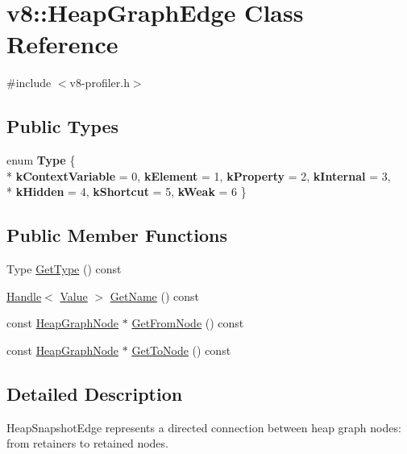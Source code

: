 \hypertarget{classv8_1_1HeapGraphEdge}{}\section{v8\+:\+:Heap\+Graph\+Edge Class Reference}
\label{classv8_1_1HeapGraphEdge}


{\ttfamily \#include $<$v8-\/profiler.\+h$>$}

\subsection*{Public Types}
\begin{DoxyCompactItemize}
\item 
\hypertarget{classv8_1_1HeapGraphEdge_a252500cf4307fe9e4fcb0335a907259b}{}enum {\bfseries Type} \{ \\*
{\bfseries k\+Context\+Variable} = 0, 
{\bfseries k\+Element} = 1, 
{\bfseries k\+Property} = 2, 
{\bfseries k\+Internal} = 3, 
\\*
{\bfseries k\+Hidden} = 4, 
{\bfseries k\+Shortcut} = 5, 
{\bfseries k\+Weak} = 6
 \}\label{classv8_1_1HeapGraphEdge_a252500cf4307fe9e4fcb0335a907259b}

\end{DoxyCompactItemize}
\subsection*{Public Member Functions}
\begin{DoxyCompactItemize}
\item 
Type \hyperlink{classv8_1_1HeapGraphEdge_a7f4923098074ee4c47d901f363728d08}{Get\+Type} () const 
\item 
\hyperlink{classv8_1_1Handle}{Handle}$<$ \hyperlink{classv8_1_1Value}{Value} $>$ \hyperlink{classv8_1_1HeapGraphEdge_aa91362db6bfdbecfc48d3ba57d292705}{Get\+Name} () const 
\item 
const \hyperlink{classv8_1_1HeapGraphNode}{Heap\+Graph\+Node} $\ast$ \hyperlink{classv8_1_1HeapGraphEdge_acd43a5082f1862b7c0c0094fc75af631}{Get\+From\+Node} () const 
\item 
const \hyperlink{classv8_1_1HeapGraphNode}{Heap\+Graph\+Node} $\ast$ \hyperlink{classv8_1_1HeapGraphEdge_ad8fd8fa121a0e778a8b120a0c5fa227c}{Get\+To\+Node} () const 
\end{DoxyCompactItemize}


\subsection{Detailed Description}
Heap\+Snapshot\+Edge represents a directed connection between heap graph nodes\+: from retainers to retained nodes. 

